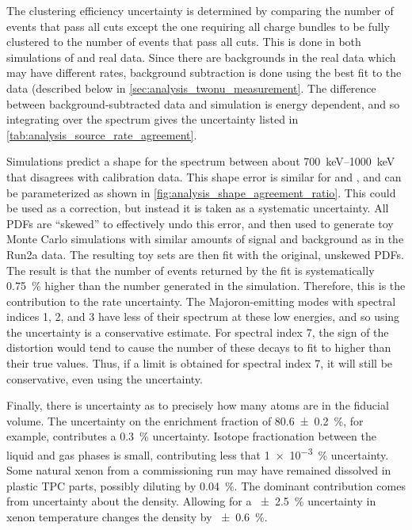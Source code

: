 \documentclass[herrin-thesis.tex]{subfiles}
\begin{document}
The clustering efficiency uncertainty is determined by comparing the number of events that pass all cuts except the one requiring all charge bundles to be fully clustered to the number of events that pass all cuts. This is done in both simulations of \twonu{} and real data. Since there are backgrounds in the real data which may have different rates, background subtraction is done using the best fit to the data (described below in \cref{sec:analysis_twonu_measurement}. The difference between background-subtracted data and simulation is energy dependent, and so integrating over the \twonu{} spectrum gives the uncertainty listed in \cref{tab:analysis_source_rate_agreement}.

Simulations predict a shape for the spectrum between about \SIrange{700}{1000}{\keV} that disagrees with calibration data. This shape error is similar for  and , and can be parameterized as shown in \cref{fig:analysis_shape_agreement_ratio}. This could be used as a correction, but instead it is taken as a systematic uncertainty. All PDFs are ``skewed'' to effectively undo this error, and then used to generate toy Monte Carlo simulations with similar amounts of signal and background as in the Run2a data. The resulting toy sets are then fit with the original, unskewed PDFs. The result is that the number of \twonu{} events returned by the fit is systematically \SI{0.75}{\percent} higher than the number generated in the simulation. Therefore, this is the contribution to the \twonu{} rate uncertainty. The Majoron-emitting modes with spectral indices 1, 2, and 3 have less of their spectrum at these low energies, and so using the \twonu{} uncertainty is a conservative estimate. For spectral index 7, the sign of the distortion would tend to cause the number of these decays to fit to higher than their true values. Thus, if a limit is obtained for spectral index 7, it will still be conservative, even using the \twonu{} uncertainty.

Finally, there is uncertainty as to precisely how many  atoms are in the fiducial volume. The uncertainty on the enrichment fraction of \SI{80.6\pm0.2}{\percent}, for example, contributes a \SI{0.3}{\percent} uncertainty. Isotope fractionation between the liquid and gas phases is small, contributing less that \SI{1e-3}{\percent} uncertainty. Some natural xenon from a commissioning run may have remained dissolved in plastic TPC parts, possibly diluting  by \SI{0.04}{\percent}. The dominant contribution comes from uncertainty about the density. Allowing for a \SI{\pm2.5}{\percent} uncertainty in xenon temperature changes the density by \SI{\pm0.6}{\percent}.
\end{document}
